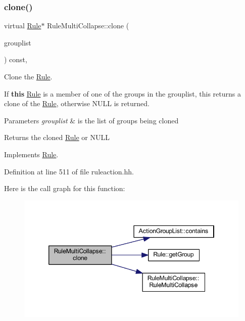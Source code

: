 \subsubsection{\texorpdfstring{clone()}{clone()}}
{\footnotesize\ttfamily virtual \mbox{\hyperlink{class_rule}{Rule}}$\ast$ Rule\+Multi\+Collapse\+::clone (\begin{DoxyParamCaption}\item[{const \mbox{\hyperlink{class_action_group_list}{Action\+Group\+List}} \&}]{grouplist }\end{DoxyParamCaption}) const\hspace{0.3cm}{\ttfamily [inline]}, {\ttfamily [virtual]}}



Clone the \mbox{\hyperlink{class_rule}{Rule}}. 

If {\bfseries{this}} \mbox{\hyperlink{class_rule}{Rule}} is a member of one of the groups in the grouplist, this returns a clone of the \mbox{\hyperlink{class_rule}{Rule}}, otherwise N\+U\+LL is returned. 
\begin{DoxyParams}{Parameters}
{\em grouplist} & is the list of groups being cloned \\
\hline
\end{DoxyParams}
\begin{DoxyReturn}{Returns}
the cloned \mbox{\hyperlink{class_rule}{Rule}} or N\+U\+LL 
\end{DoxyReturn}


Implements \mbox{\hyperlink{class_rule_a70de90a76461bfa7ea0b575ce3c11e4d}{Rule}}.



Definition at line 511 of file ruleaction.\+hh.

Here is the call graph for this function\+:
\nopagebreak
\begin{figure}[H]
\begin{center}
\leavevmode
\includegraphics[width=346pt]{class_rule_multi_collapse_a6aceb3f6d65434184d65727bdc6da79e_cgraph}
\end{center}
\end{figure}
\mbox{\label{class_rule_multi_collapse_adb7760b376adb4def48cf5df2645bb6f}} 
